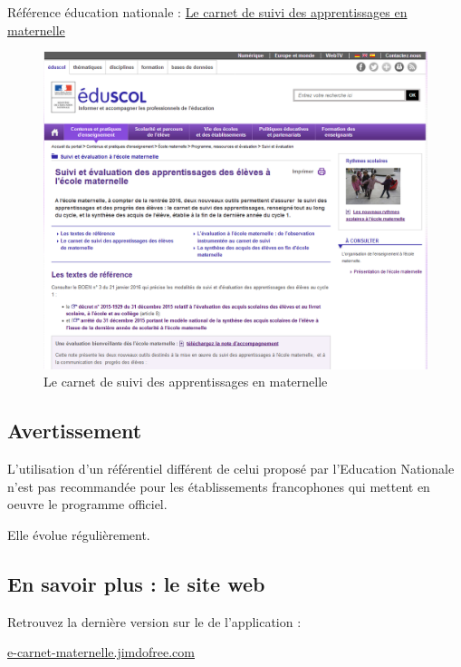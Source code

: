 \documentclass[oneside]{book}
\begin{document}
Référence éducation nationale :
\href{http://eduscol.education.fr/cid97131/suivi-et-evaluation-a-l-ecole-maternelle.html}{Le
carnet de suivi des apprentissages en maternelle}

\begin{figure}
\centering
\includegraphics{./screenshots/2018-01-27-18-00-46.png}
\caption{Le carnet de suivi des apprentissages en maternelle}
\end{figure}

\hypertarget{avertissement}{%
\subsection{Avertissement}\label{avertissement}}

L'utilisation d'un référentiel différent de celui proposé par
l'Education Nationale n'est pas recommandée pour les établissements
francophones qui mettent en oeuvre le programme officiel.

Elle évolue régulièrement.

\hypertarget{en-savoir-plus-le-site-web}{%
\subsection{En savoir plus : le site
web}\label{en-savoir-plus-le-site-web}}

Retrouvez la dernière version sur le  de l'application :

\href{https://e-carnet-maternelle.jimdofree.com/}{e-carnet-maternelle.jimdofree.com}
\end{document}
